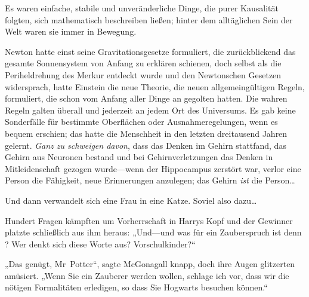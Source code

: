 Es waren einfache, stabile und unveränderliche Dinge, die purer Kausalität folgten, sich mathematisch beschreiben ließen; hinter dem alltäglichen Sein der Welt waren sie immer in Bewegung.

Newton hatte einst seine Gravitationsgesetze formuliert, die zurückblickend das gesamte Sonnensystem von Anfang zu erklären schienen, doch selbst als die Periheldrehung des Merkur entdeckt wurde und den Newtonschen Gesetzen widersprach, hatte Einstein die neue Theorie, die neuen allgemeingültigen Regeln, formuliert, die schon vom Anfang aller Dinge an gegolten hatten. Die wahren Regeln galten überall und jederzeit an jedem Ort des Universums. Es gab keine Sonderfälle für bestimmte Oberflächen oder Ausnahmeregelungen, wenn es bequem erschien; das hatte die Menschheit in den letzten dreitausend Jahren gelernt. \emph{Ganz zu schweigen davon}, dass das Denken im Gehirn stattfand, das Gehirn aus Neuronen bestand und bei Gehirnverletzungen das Denken in Mitleidenschaft gezogen wurde—wenn der Hippocampus zerstört war, verlor eine Person die Fähigkeit, neue Erinnerungen anzulegen; das Gehirn \emph{ist} die Person…%

Und dann verwandelt sich eine Frau in eine Katze. Soviel also dazu…

Hundert Fragen kämpften um Vorherrschaft in Harrys Kopf und der Gewinner platzte schließlich aus ihm heraus: „Und—und was für ein Zauberspruch ist denn ? Wer denkt sich diese Worte aus? Vorschulkinder?“

„Das genügt, Mr~Potter“, sagte McGonagall knapp, doch ihre Augen glitzerten amüsiert. „Wenn Sie ein Zauberer werden wollen, schlage ich vor, dass wir die nötigen Formalitäten erledigen, so dass Sie Hogwarts besuchen können.“

